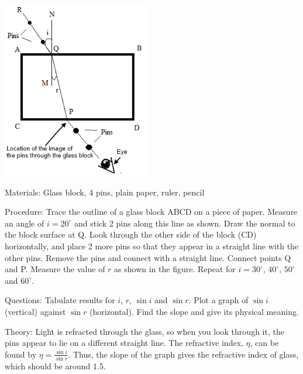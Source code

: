 \begin{multicols}{2}
\begin{center}
\includegraphics[width=0.49\textwidth]{./img/refractive-index-1.png}
\end{center}

\begin{description*}
\item[Materials:]{Glass block, 4 pins, plain paper, ruler, pencil}
\item[Procedure:]{Trace the outline of a glass block ABCD on a piece of paper. Measure an angle of $i=20^\circ$ and stick 2 pins along this line as shown. Draw the normal to the block surface at Q. Look through the other side of the block (CD) horizontally, and place 2 more pins so that they appear in a straight line with the other pins. Remove the pins and connect with a straight line. Connect points Q and P. Measure the value of $r$ as shown in the figure. Repeat for $i=30^\circ$, $40^\circ$, $50^\circ$ and $60^\circ$.}
\item[Questions:]{Tabulate results for $i$, $r$, $\sin{i}$ and $\sin{r}$. Plot a graph of $\sin{i}$ (vertical) against $\sin{r}$ (horizontal). Find the slope and give its physical meaning.}
\item[Theory:]{Light is refracted through the glass, so when you look through it, the pins appear to lie on a different straight line. The refractive index, $\eta$, can be found by $\eta = \frac{\sin{i}}{\sin{r}}$. Thus, the slope of the graph gives the refractive index of glass, which should be around 1.5.}
\end{description*}


\end{multicols}
